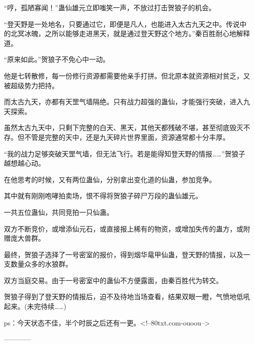 \begin{this_body}
“哼，孤陋寡闻！”蛊仙雄元立即嗤笑一声，不放过打击贺狼子的机会。

“登天野是一处地名，只要通过它，即便是凡人，也能进入太古九天之中。传说中的北冥冰魄，之所以能够走进黑天，就是通过登天野这个地方。”秦百胜耐心地解释道。

“原来如此。”贺狼子不免心中一动。

他是七转散修，每一份修行资源都需要他亲手打拼。但北原本就资源相对贫乏，又被超级势力把持。

而太古九天，亦都有天罡气墙隔绝。只有战力超强的蛊仙，才能强行突破，进入九天探索。

虽然太古九天中，只剩下完整的白天、黑天，其他天都残破不堪，甚至彻底毁灭不存。但不管是完整的天中，还是九天碎片世界里面，资源通常都十分丰厚。

“我的战力足够突破天罡气墙，但无法飞行。若是能得知登天野的情报……”贺狼子越想越心动。

在他思考的时候，又有两位蛊仙，分别拿出变化道的仙蛊，参加竞争。

其中就有刚刚咆哮拍卖场，恨不得将贺狼子碎尸万段的蛊仙雄元。

一共五位蛊仙，共同竞拍一只仙蛊。

双方不断竞价，或增添仙元石，或直接报上稀有的物资，或增加失传的蛊方，或附赠庞大兽群。

最终，贺狼子选择了一号密室的报价，得到烟华鼋甲仙蛊，登天野的情报，以及一支数量众多的水狼群。

双方当庭交易。由于一号密室中的蛊仙不方便露面，由秦百胜代为转交。

贺狼子得到了登天野的情报后，迫不及待地当场查看，结果双眼一瞪，气愤地低吼起来。(未完待续……)

ps：今天状态不佳，半个时辰之后还有一更。<!--80txt.com-ouoou-->

------------

\end{this_body}

